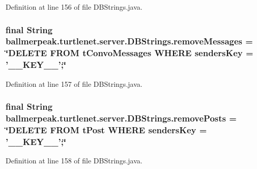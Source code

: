 Definition at line 156 of file D\-B\-Strings.\-java.

\hypertarget{classballmerpeak_1_1turtlenet_1_1server_1_1DBStrings_a1b06410e67831509b9f39c59360cd3a4}{
\subsubsection[{remove\-Messages}]{\setlength{\rightskip}{0pt plus 5cm}final String ballmerpeak.\-turtlenet.\-server.\-D\-B\-Strings.\-remove\-Messages = \char`\"{}D\-E\-L\-E\-T\-E F\-R\-O\-M t\-Convo\-Messages W\-H\-E\-R\-E senders\-Key = '\-\_\-\-\_\-\-K\-E\-Y\-\_\-\-\_\-';\char`\"{}\hspace{0.3cm}{\ttfamily [static]}}}\label{classballmerpeak_1_1turtlenet_1_1server_1_1DBStrings_a1b06410e67831509b9f39c59360cd3a4}


Definition at line 157 of file D\-B\-Strings.\-java.

\hypertarget{classballmerpeak_1_1turtlenet_1_1server_1_1DBStrings_a558a3b46958bfa577aecc36b4f2c7b2f}{
\subsubsection[{remove\-Posts}]{\setlength{\rightskip}{0pt plus 5cm}final String ballmerpeak.\-turtlenet.\-server.\-D\-B\-Strings.\-remove\-Posts = \char`\"{}D\-E\-L\-E\-T\-E F\-R\-O\-M t\-Post W\-H\-E\-R\-E senders\-Key = '\-\_\-\-\_\-\-K\-E\-Y\-\_\-\-\_\-';\char`\"{}\hspace{0.3cm}{\ttfamily [static]}}}\label{classballmerpeak_1_1turtlenet_1_1server_1_1DBStrings_a558a3b46958bfa577aecc36b4f2c7b2f}


Definition at line 158 of file D\-B\-Strings.\-java.

